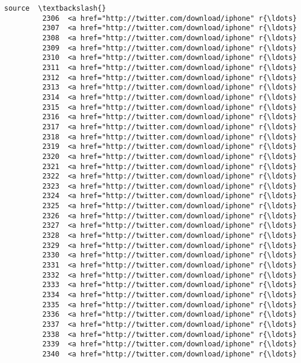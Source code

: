 \documentclass[11pt]{article}
\begin{document}
\begin{Verbatim}[commandchars=\\\{\}]
                                                          source  \textbackslash{}
         2306  <a href="http://twitter.com/download/iphone" r{\ldots}   
         2307  <a href="http://twitter.com/download/iphone" r{\ldots}   
         2308  <a href="http://twitter.com/download/iphone" r{\ldots}   
         2309  <a href="http://twitter.com/download/iphone" r{\ldots}   
         2310  <a href="http://twitter.com/download/iphone" r{\ldots}   
         2311  <a href="http://twitter.com/download/iphone" r{\ldots}   
         2312  <a href="http://twitter.com/download/iphone" r{\ldots}   
         2313  <a href="http://twitter.com/download/iphone" r{\ldots}   
         2314  <a href="http://twitter.com/download/iphone" r{\ldots}   
         2315  <a href="http://twitter.com/download/iphone" r{\ldots}   
         2316  <a href="http://twitter.com/download/iphone" r{\ldots}   
         2317  <a href="http://twitter.com/download/iphone" r{\ldots}   
         2318  <a href="http://twitter.com/download/iphone" r{\ldots}   
         2319  <a href="http://twitter.com/download/iphone" r{\ldots}   
         2320  <a href="http://twitter.com/download/iphone" r{\ldots}   
         2321  <a href="http://twitter.com/download/iphone" r{\ldots}   
         2322  <a href="http://twitter.com/download/iphone" r{\ldots}   
         2323  <a href="http://twitter.com/download/iphone" r{\ldots}   
         2324  <a href="http://twitter.com/download/iphone" r{\ldots}   
         2325  <a href="http://twitter.com/download/iphone" r{\ldots}   
         2326  <a href="http://twitter.com/download/iphone" r{\ldots}   
         2327  <a href="http://twitter.com/download/iphone" r{\ldots}   
         2328  <a href="http://twitter.com/download/iphone" r{\ldots}   
         2329  <a href="http://twitter.com/download/iphone" r{\ldots}   
         2330  <a href="http://twitter.com/download/iphone" r{\ldots}   
         2331  <a href="http://twitter.com/download/iphone" r{\ldots}   
         2332  <a href="http://twitter.com/download/iphone" r{\ldots}   
         2333  <a href="http://twitter.com/download/iphone" r{\ldots}   
         2334  <a href="http://twitter.com/download/iphone" r{\ldots}   
         2335  <a href="http://twitter.com/download/iphone" r{\ldots}   
         2336  <a href="http://twitter.com/download/iphone" r{\ldots}   
         2337  <a href="http://twitter.com/download/iphone" r{\ldots}   
         2338  <a href="http://twitter.com/download/iphone" r{\ldots}   
         2339  <a href="http://twitter.com/download/iphone" r{\ldots}   
         2340  <a href="http://twitter.com/download/iphone" r{\ldots}   

\end{Verbatim}
\end{document}
